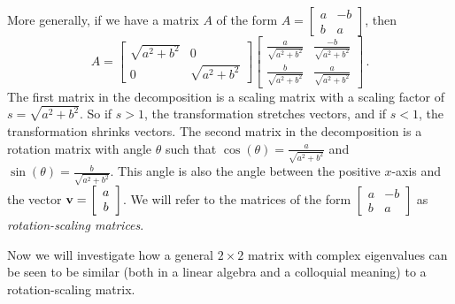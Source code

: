 More generally, if we have a matrix $A$ of the form $A=\left[ \begin{array}{cr} a&-b \\ b&a \end{array} \right]$, then 
\[ A = \left[ \begin{array}{cc} \sqrt{a^2+b^2} &0 \\ 0&\sqrt{a^2+b^2} \end{array} \right] \left[ \begin{array}{cc} \frac{a}{\sqrt{a^2+b^2}}&\frac{-b}{\sqrt{a^2+b^2}} \\ \frac{b}{\sqrt{a^2+b^2}}&\frac{a}{\sqrt{a^2+b^2}}\end{array} \right] \, .\]
The first matrix in the decomposition is a scaling matrix with a scaling factor of $s=\sqrt{a^2+b^2}$. So if $s>1$, the transformation stretches vectors, and if $s<1$, the transformation shrinks vectors. The second matrix in the decomposition is a rotation matrix with angle $\theta$ such that $\cos(\theta)=\frac{a}{\sqrt{a^2+b^2}}$ and $\sin(\theta)=\frac{b}{\sqrt{a^2+b^2}}$. This angle is also the angle between the positive $x$-axis and the vector $\mathbf{v}=\left[ \begin{array}{c} a\\ b\end{array} \right]$. We will refer to the matrices of the form $\left[ \begin{array}{cr} a&-b \\ b&a \end{array} \right]$ as \emph{rotation-scaling matrices}. 


Now we will investigate how a general $2\times 2$ matrix with complex eigenvalues can be seen to be similar (both in a linear algebra and a colloquial meaning) to a rotation-scaling matrix.



